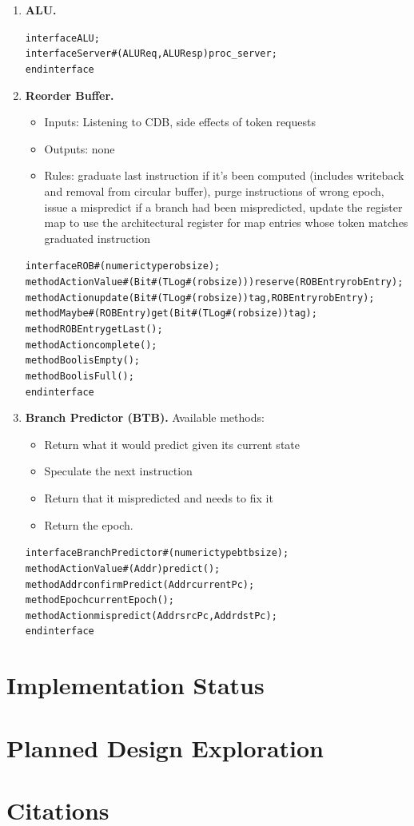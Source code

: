 \documentclass[12pt]{article}
\begin{document}
\begin{enumerate}
    \item \textbf{ALU.}
    \begin{alltt}
        interface ALU;
            interface Server#(ALUReq, ALUResp) proc_server;
        endinterface
    \end{alltt}
    
    \item \textbf{Reorder Buffer.}
    \begin{itemize}
        \item[] Inputs: Listening to CDB, side effects of token requests
        \item[] Outputs: none
        \item[] Rules: graduate last instruction if it's been computed (includes writeback and removal from circular
        buffer), purge instructions of wrong epoch, issue a mispredict if a branch had been mispredicted, update the register map to use the architectural register for map entries whose token matches graduated instruction
    \end{itemize}
    \begin{alltt}
        interface ROB#(numeric type robsize);
          method ActionValue#(Bit#(TLog#(robsize))) reserve(ROBEntry robEntry);
          method Action update(Bit#(TLog#(robsize)) tag, ROBEntry robEntry);
          method Maybe#(ROBEntry) get(Bit#(TLog#(robsize)) tag);
          method ROBEntry getLast();
          method Action complete();
          method Bool isEmpty();
          method Bool isFull();
        endinterface
    \end{alltt}

    \item \textbf{Branch Predictor (BTB).} Available methods:
        \begin{itemize}
            \item[] Return what it would predict given its current state
            \item[] Speculate the next instruction
            \item[] Return that it mispredicted and needs to fix it
            \item[] Return the epoch.
        \end{itemize}

    \begin{alltt}
        interface BranchPredictor#(numeric type btbsize);
        	method ActionValue#(Addr) predict();
        	method Addr confirmPredict(Addr currentPc);
        	method Epoch currentEpoch();
        	method Action mispredict(Addr srcPc, Addr dstPc);
        endinterface
    \end{alltt}

\end{enumerate}

    \section{Implementation Status}
    
    \section{Planned Design Exploration}
    
    \section{Citations}
    

 
\end{document}
